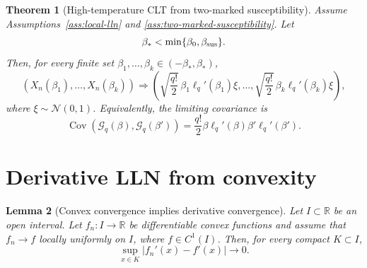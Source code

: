 \documentclass[11pt]{article}
\newtheorem{theorem}{Theorem}[section]
\newtheorem{lemma}[theorem]{Lemma}
\newcommand{\Cov}{\operatorname{Cov}}
\newcommand{\N}{\mathcal{N}}
\newcommand{\R}{\mathbb{R}}
\newcommand{\calG}{\mathcal{G}}
\begin{document}
\begin{theorem}[High-temperature CLT from two-marked susceptibility]
  \label{thm:main-clt}
  Assume Assumptions~\ref{ass:local-lln} and
  \ref{ass:two-marked-susceptibility}.  Let
  \begin{equation}\label{eq:beta-star}
    \beta_*<\min\{\beta_0,\beta_{\rm sus}\}.
  \end{equation}
  Then, for every finite set $\beta_1,\ldots,\beta_k\in(-\beta_*,\beta_*)$,
  \begin{equation}\label{eq:fdd-clt}
    (X_n(\beta_1),\ldots,X_n(\beta_k))
    \Rightarrow
    \left(
      \sqrt{\frac{q!}{2}}\,\beta_1\ell_q'(\beta_1)\xi,
      \ldots,
      \sqrt{\frac{q!}{2}}\,\beta_k\ell_q'(\beta_k)\xi
    \right),
  \end{equation}
  where $\xi\sim\N(0,1)$.  Equivalently, the limiting covariance is
  \begin{equation}\label{eq:limit-covariance}
    \Cov(\calG_q(\beta),\calG_q(\beta'))
    =
    \frac{q!}{2}\beta\ell_q'(\beta)\beta'\ell_q'(\beta').
  \end{equation}
\end{theorem}

\section{Derivative LLN from convexity}

\begin{lemma}[Convex convergence implies derivative convergence]
  \label{lem:convex-derivative}
  Let $I\subset\R$ be an open interval.  Let $f_n:I\to\R$ be differentiable
  convex functions and assume that $f_n\to f$ locally uniformly on $I$, where
  $f\in C^1(I)$.  Then, for every compact $K\subset I$,
  \begin{equation}\label{eq:convex-derivative-conclusion}
    \sup_{x\in K}|f_n'(x)-f'(x)|\to0.
  \end{equation}
\end{lemma}
\end{document}

